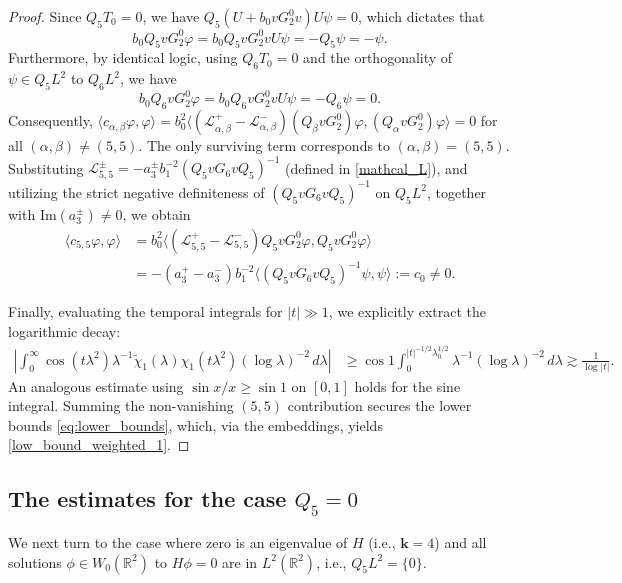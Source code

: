 \documentclass[reqno]{amsart}
\numberwithin{equation}{section}
\begin{document}
\begin{proof}
	 Since $Q_5 T_0 = 0$, we have $Q_5(U + b_0 v G_2^0 v)U \psi = 0$, which dictates that  
	\[  
	b_0 Q_5 v G_2^0 \varphi = b_0 Q_5 v G_2^0 v U \psi = -Q_5 \psi = -\psi.  
	\]  
Furthermore, by identical logic, using $Q_6T_0=0$ and the orthogonality of $\psi \in Q_5 L^2$ to $Q_6 L^2$, we have
	$$
	b_0 Q_6 v G_2^0 \varphi=b_0 Q_6 v G_2^0 v U \psi =  -Q_6 \psi=0.
	$$
 Consequently, $\langle c_{\alpha,\beta} \varphi, \varphi \rangle=b_0^2\big\langle (\mathcal{L}_{\alpha,\beta}^+ -\mathcal{L}_{\alpha,\beta}^-) (Q_\beta v G_2^0)\varphi, (Q_\alpha v G_2^0)\varphi \big\rangle=0$
  for all $(\alpha,\beta) \neq (5,5)$.  
	The only surviving term corresponds to $(\alpha,\beta)=(5,5)$. Substituting \(\mathcal{L}_{5,5}^{\pm}=-a_3^\pm b_1^{-2}(Q_5vG_6vQ_5)^{-1}\) (defined in \eqref{mathcal_L}), and utilizing the strict negative definiteness of \((Q_5 v G_6 v Q_5)^{-1}\) on $Q_5L^2$, together with $\text{Im}(a_3^\pm) \neq 0$, we obtain
	\begin{align*}  
		\langle c_{5,5} \varphi, \varphi \rangle &= b_0^2 \big\langle (\mathcal{L}_{5,5}^+ -\mathcal{L}_{5,5}^-) Q_5 v G_2^0 \varphi, Q_5 v G_2^0 \varphi \big\rangle \\  
		&= -(a_3^+ - a_3^-) b_1^{-2}\big\langle (Q_5 v G_6 v Q_5)^{-1} \psi, \psi \big\rangle := c_0 \neq 0.  
	\end{align*}  
	
	Finally, evaluating the temporal integrals for $|t| \gg 1$, we explicitly extract the logarithmic decay:  
	\begin{align*}  
		\left|\int_0^{\infty} \cos(t\lambda^2) \lambda^{-1} \widetilde{\chi}_1(\lambda)  \chi_1(t \lambda^2) (\log \lambda)^{-2} \, d\lambda \right| &\ge \cos 1 \int_0^{|t|^{-1/2} \lambda_0^{1/2}} \lambda^{-1} (\log \lambda)^{-2} \, d\lambda \gtrsim \frac{1}{\log |t|}.  
	\end{align*}  
		An analogous estimate using ${\sin x}/{x} \ge \sin 1$ on $[0,1]$ holds for the sine integral. Summing the non-vanishing $(5,5)$ contribution secures the lower bounds \eqref{eq:lower_bounds}, which, via the embeddings,  yields \eqref{low_bound_weighted_1}. 
\end{proof}  


\subsection{The estimates for the case $Q_{5} = 0$}
We next turn to the case where zero is an eigenvalue of $H$ (i.e., $\mathbf{k} = 4$) and all solutions $\phi \in W_{0}(\mathbb{R}^2)$ to $H\phi = 0$ are in $L^2(\mathbb{R}^2)$, i.e., $Q_5 L^2 = \{0\}$.
\end{document}
